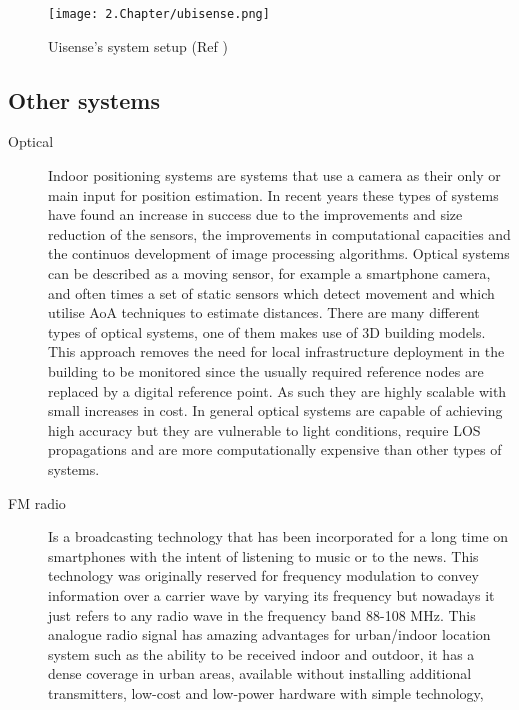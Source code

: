 \begin{figure}[H]
	\centering
		\texttt{[image: 2.Chapter/ubisense.png]}
	\caption[Uisense's system setup (Ref \cite{ubisense}) ]{Uisense's system setup (Ref \cite{ubisense})}
	\label{fig:ubisense}
\end{figure}


\subsection{Other systems}
\label{subsec:others}

\begin{description}

\item [Optical]  Indoor positioning systems are systems that use a camera as their only or main input for position estimation. In recent years these types of systems have found an increase in success due to the improvements and size reduction of the sensors, the improvements in computational capacities and the continuos development of image processing algorithms. Optical systems can be described as a moving sensor, for example a smartphone camera, and often times a set of static sensors which detect movement and which utilise \ac{AoA} techniques to estimate distances. There are many different types of optical systems, one of them makes use of 3D building models. This approach removes the need for local infrastructure deployment in the building to be monitored since the usually required reference nodes are replaced by a digital reference point. As such they are highly scalable with small increases in cost.
In general optical systems are capable of achieving high accuracy but they are vulnerable to light conditions, require \ac{LOS} propagations and are more computationally expensive than other types of systems.


\item [\ac{FM} radio]  Is a broadcasting technology that has been incorporated for a long time on smartphones with the intent of listening to music or to the news. This technology was originally reserved for frequency modulation to convey information over a carrier wave by varying its frequency but nowadays it just refers to any radio wave in the frequency band 88-108 MHz. This analogue radio signal has amazing advantages for urban/indoor location system such as the ability to be received indoor and outdoor, it has a dense coverage in urban areas, available without installing additional transmitters, low-cost and low-power hardware with simple technology, high received signal power and there are a large number of transmitters which provides good geometry for locating. One crucial part when utilising \ac{FM} is that it doesn't carry any timing information which is critical in range calculation and the fact that as other radio frequency technologies, it suffers from  multi-path effects and non-\ac{LOS} signals. An example of FM system was created by  et al. \cite{fm} which implemented an \ac{RSSI} fingerprint-based system using FM radios in an office environment. The system's test bed obtained 17 FM channels at each point of the fingerprint and it was capable of achieving a mean accuracy of 3 meters.



\end{description}
